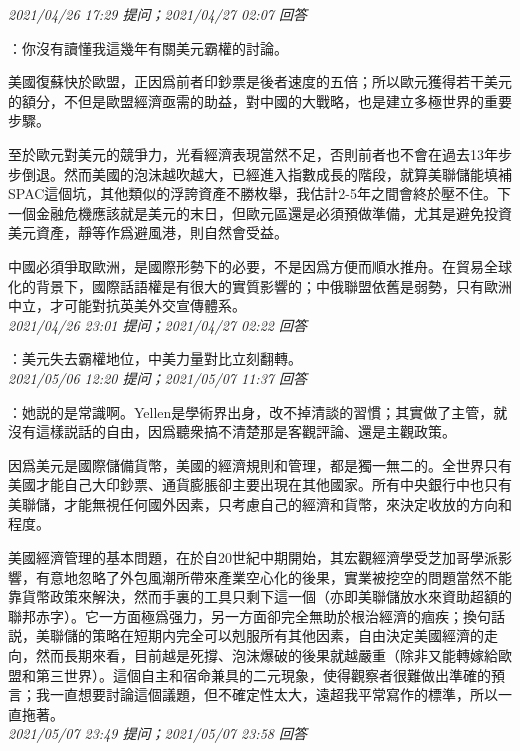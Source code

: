 \documentclass[twocolumn]{ctexart}
\begin{document}
\textit{\hfill\noindent\small 2021/04/26 17:29 提问；2021/04/27 02:07 回答}

：你沒有讀懂我這幾年有關美元霸權的討論。

美國復蘇快於歐盟，正因爲前者印鈔票是後者速度的五倍；所以歐元獲得若干美元的額分，不但是歐盟經濟亟需的助益，對中國的大戰略，也是建立多極世界的重要步驟。

至於歐元對美元的競爭力，光看經濟表現當然不足，否則前者也不會在過去13年步步倒退。然而美國的泡沫越吹越大，已經進入指數成長的階段，就算美聯儲能填補SPAC這個坑，其他類似的浮誇資產不勝枚舉，我估計2-5年之間會終於壓不住。下一個金融危機應該就是美元的末日，但歐元區還是必須預做準備，尤其是避免投資美元資產，靜等作爲避風港，則自然會受益。

中國必須爭取歐洲，是國際形勢下的必要，不是因爲方便而順水推舟。在貿易全球化的背景下，國際話語權是有很大的實質影響的；中俄聯盟依舊是弱勢，只有歐洲中立，才可能對抗英美外交宣傳體系。
\\

\textit{\hfill\noindent\small 2021/04/26 23:01 提问；2021/04/27 02:22 回答}

：美元失去霸權地位，中美力量對比立刻翻轉。
\\

\textit{\hfill\noindent\small 2021/05/06 12:20 提问；2021/05/07 11:37 回答}

：她説的是常識啊。Yellen是學術界出身，改不掉清談的習慣；其實做了主管，就沒有這樣説話的自由，因爲聽衆搞不清楚那是客觀評論、還是主觀政策。

因爲美元是國際儲備貨幣，美國的經濟規則和管理，都是獨一無二的。全世界只有美國才能自己大印鈔票、通貨膨脹卻主要出現在其他國家。所有中央銀行中也只有美聯儲，才能無視任何國外因素，只考慮自己的經濟和貨幣，來決定收放的方向和程度。

美國經濟管理的基本問題，在於自20世紀中期開始，其宏觀經濟學受芝加哥學派影響，有意地忽略了外包風潮所帶來產業空心化的後果，實業被挖空的問題當然不能靠貨幣政策來解決，然而手裏的工具只剩下這一個（亦即美聯儲放水來資助超額的聯邦赤字）。它一方面極爲强力，另一方面卻完全無助於根治經濟的痼疾；換句話説，美聯儲的策略在短期内完全可以剋服所有其他因素，自由決定美國經濟的走向，然而長期來看，目前越是死撐、泡沫爆破的後果就越嚴重（除非又能轉嫁給歐盟和第三世界）。這個自主和宿命兼具的二元現象，使得觀察者很難做出準確的預言；我一直想要討論這個議題，但不確定性太大，遠超我平常寫作的標準，所以一直拖著。
\\

\textit{\hfill\noindent\small 2021/05/07 23:49 提问；2021/05/07 23:58 回答}
\end{document}
